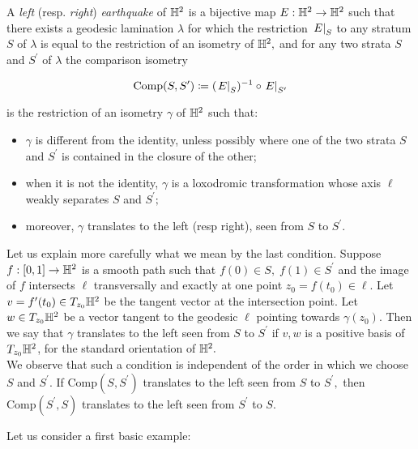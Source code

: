 \begin{definition}
    A \textit{left} (resp. \textit{right}) \textit{earthquake} of $\mathbb{H}^2$ is a bijective map $E:\mathbb{H}^2\to\mathbb{H}^2$ such that there exists a geodesic lamination $\lambda$ for which the restriction $\left.E\right|_{S}$ to any stratum $S$ of $\lambda$ is equal to the restriction of an isometry of $\mathbb{H}^2,$ and for any two strata $S$ and $S^{\prime}$ of $\lambda$ the comparison isometry 
    
    \[
        \text{Comp}(S,S^{\prime})\coloneqq (\left.E\right|_{S})^{-1}\circ \left.E\right|_{S^{\prime} }
    \]

    is the restriction of an isometry $\gamma$ of $\mathbb{H}^2$ such that:
    \begin{itemize}
        \item $\gamma$ is different from the identity, unless possibly where one of the two strata $S$ and $S^{\prime}$ is contained in the closure of the other;
        \item when it is not the identity, $\gamma$ is a loxodromic transformation whose axis $\ell$ weakly separates $S$ and $S^{\prime};$
        \item moreover, $\gamma$ translates to the left (resp right), seen from $S$ to $S^{\prime}$. 
    \end{itemize}
\end{definition}

Let us explain more carefully what we mean by the last condition. Suppose $f:[0,1]\to\mathbb{H}^2$ is a smooth path such that $f(0)\in S,\;f(1)\in S^{\prime}$ and the image of $f$ intersects $\ell$ transversally and exactly at one point $z_0=f(t_0)\in\ell.$ Let $v=f^{\prime}(t_0)\in T_{z_0}\mathbb{H}^2$ be the tangent vector at the intersection point. Let $w\in T_{z_0}\mathbb{H}^2$ be a vector tangent to the geodesic $\ell$ pointing towards $\gamma(z_0).$ Then we say that $\gamma$ translates to the left seen from $S$ to $S^{\prime} $ if $v,w$ is a positive basis of $T_{z_0}\mathbb{H}^2$, for the standard orientation of $\mathbb{H}^2.$\\
We observe that such a condition is independent of the order in which we choose $S$ and $S^{\prime}.$ If $\text{Comp}(S,S^{\prime})$ translates to the left seen from $S$ to $S^{\prime},$ then $\text{Comp}(S^{\prime} ,S)$ translates to the left seen from $S^{\prime} $ to $S.$ 

Let us consider a first basic example: 

